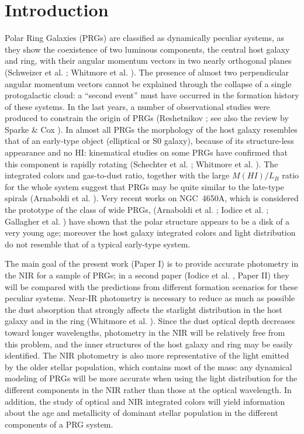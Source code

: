 \documentclass{aa}
\begin{document}
\section{Introduction}

Polar Ring Galaxies (PRGs) are classified as dynamically peculiar systems, 
as they show the coexistence of two luminous components, the central
host  galaxy and ring, with their angular momentum vectors in two nearly
orthogonal  planes (Schweizer et al. \cite{Schweizer83}; Whitmore et
al. \cite{PRC}).
The presence of almost two perpendicular angular momentum vectors 
cannot be explained through the collapse of a single 
protogalactic cloud: a ``second event'' must have occurred in the formation 
history of these systems. 
In the last years, a number of observational studies were produced 
to constrain the origin of PRGs (Reshetnikov \cite{Resh97}; see also the
review by Sparke \& Cox \cite{Cox2000}).
In almost all PRGs the morphology of the host galaxy resembles that of
an early-type object (elliptical or S0 galaxy), because of its structure-less 
appearance and no HI: kinematical studies on
some PRGs have confirmed that this component is rapidly rotating
(Schechter et al. \cite{Schechter84}; Whitmore et al. \cite{PRC}).
The integrated colors and gas-to-dust ratio, together with the
large $M(HI)/L_B$ ratio for the whole system suggest that PRGs may be 
quite similar to the late-type spirals (Arnaboldi et al. \cite{magda95}).
Very recent works on NGC~4650A, which is considered the prototype of the class
of wide PRGs, (Arnaboldi et al. \cite{magda97};
Iodice et al. \cite{4650aI}; Gallagher et al. \cite{4650aG}) 
have shown that the polar structure appears to be a disk of a very young
age; moreover the host galaxy integrated colors and light
distribution do not resemble that of a typical early-type system. 

The main goal of the present work (Paper I) is to provide accurate photometry
in the NIR for a sample of PRGs; in a second paper (Iodice et al. \cite{paperII}, 
Paper II) they will be compared with the predictions 
from different formation scenarios for these peculiar systems.
Near-IR photometry is necessary to reduce as much as possible the
dust absorption that strongly affects the starlight distribution in the host
galaxy and in the ring (Whitmore et al. \cite{PRC}). Since the dust optical 
depth decreases toward longer wavelengths, photometry in the NIR
will be relatively free from this problem, and the inner structures
of the host galaxy and ring may be easily identified. 
The NIR photometry is also more representative
of the light emitted by the older stellar population, which contains most
of the mass: any dynamical modeling of PRGs
will be more accurate when using the light distribution for the
different components in the NIR rather than those at the optical
wavelength.                               
In addition, the study of optical and NIR integrated colors will yield
information about the age and metallicity of dominant stellar population
in the different components of a PRG system.
\end{document}
